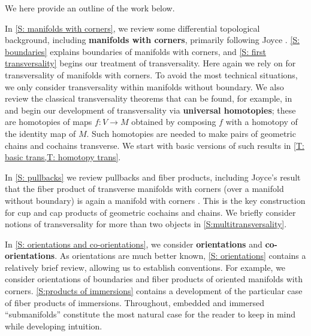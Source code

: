 
We here provide an outline of the work below.

In \cref{S: manifolds with corners}, we review some differential topological background,  including \textbf{manifolds with corners}, primarily following Joyce \cite{Joy12}.
\cref{S: boundaries} explains boundaries of manifolds with corners, and \cref{S: first transversality} begins our treatment of transversality. Here again we rely on \cite{Joy12} for transversality of manifolds with corners. To avoid the most technical situations, we only consider transversality within manifolds without boundary.
We also review the classical transversality theorems that can be found, for example, in \cite{GuPo74} and
begin our development of transversality via \textbf{universal homotopies}; these are homotopies of maps $f \colon V \to M$ obtained by composing $f$ with a homotopy of the identity map of $M$.
Such homotopies are needed to make pairs of geometric chains and cochains transverse.
We start with basic versions of such results in \cref{T: basic trans,T: homotopy trans}.

In \cref{S: pullbacks} we review pullbacks and fiber products, including Joyce's result that the fiber product of transverse manifolds with corners (over a manifold without boundary) is again a manifold with corners \cite{Joy12}.
This is the key construction for cup and cap products of geometric cochains and chains.
We briefly consider notions of transversality for more than two objects in \cref{S:multitransversality}.

In \cref{S: orientations and co-orientations}, we consider \textbf{orientations} and \textbf{co-orientations}.
As orientations are much better known, \cref{S: orientations} contains a relatively brief review, allowing us to establish conventions.
For example, we consider orientations of boundaries and fiber products of oriented manifolds with corners. \cref{S:products of immersions} contains a development of the particular case of fiber products of immersions.
Throughout, embedded and immersed ``submanifolds'' constitute the most natural case for the reader to keep in mind while developing intuition.

